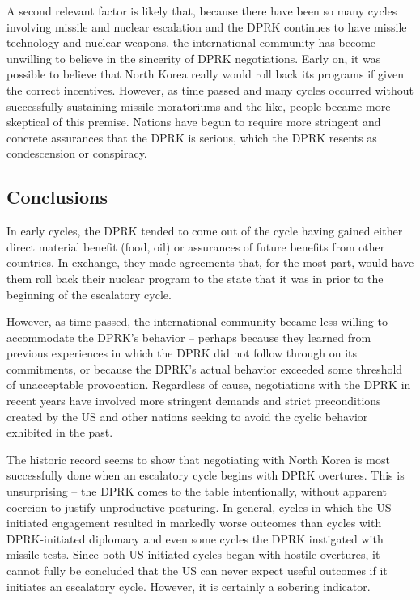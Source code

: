 \documentclass{article}
\begin{document}
A second relevant factor is likely that, because there have been so many cycles involving missile and nuclear escalation and the DPRK continues to have missile technology and nuclear weapons, the international community has become unwilling to believe in the sincerity of DPRK negotiations. Early on, it was possible to believe that North Korea really would roll back its programs if given the correct incentives. However, as time passed and many cycles occurred without successfully sustaining missile moratoriums and the like, people became more skeptical of this premise. Nations have begun to require more stringent and concrete assurances that the DPRK is serious, which the DPRK resents as condescension or conspiracy.


\subsection{Conclusions}
In early cycles, the DPRK tended to come out of the cycle having gained either direct material benefit (food, oil) or assurances of future benefits from other countries. In exchange, they made agreements that, for the most part, would have them roll back their nuclear program to the state that it was in prior to the beginning of the escalatory cycle.

However, as time passed, the international community became less willing to accommodate the DPRK’s behavior – perhaps because they learned from previous experiences in which the DPRK did not follow through on its commitments, or because the DPRK’s actual behavior exceeded some threshold of unacceptable provocation. Regardless of cause, negotiations with the DPRK in recent years have involved more stringent demands and strict preconditions created by the US and other nations seeking to avoid the cyclic behavior exhibited in the past.

The historic record seems to show that negotiating with North Korea is most successfully done when an escalatory cycle begins with DPRK overtures. This is unsurprising – the DPRK comes to the table intentionally, without apparent coercion to justify unproductive posturing. In general, cycles in which the US initiated engagement resulted in markedly worse outcomes than cycles with DPRK-initiated diplomacy and even some cycles the DPRK instigated with missile tests. Since both US-initiated cycles began with hostile overtures, it cannot fully be concluded that the US can never expect useful outcomes if it initiates an escalatory cycle. However, it is certainly a sobering indicator.
\end{document}
